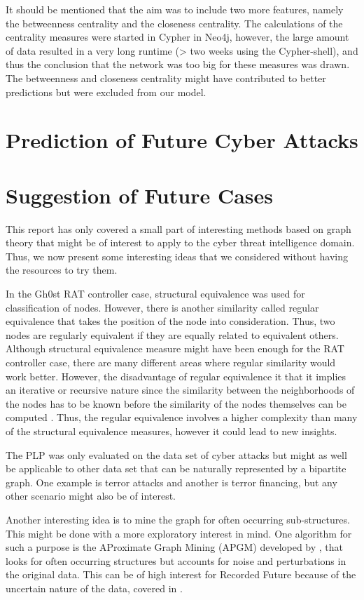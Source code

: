It should be mentioned that the aim was to include two more features, namely the betweenness centrality and the closeness centrality. The calculations of the centrality measures were started in Cypher in Neo4j, however, the large amount of data resulted in a very long runtime (> two weeks using the Cypher-shell), and thus the conclusion that the network was too big for these measures was drawn. The betweenness and closeness centrality might have contributed to better predictions but were excluded from our model.


\section{Prediction of Future Cyber Attacks}


\section{Suggestion of Future Cases}
This report has only covered a small part of interesting methods based on graph theory that might be of interest to apply to the cyber threat intelligence domain. Thus, we now present some interesting ideas that we considered without having the resources to try them. 

In the Gh0st RAT controller case, structural equivalence was used for classification of nodes. However, there is another similarity called regular equivalence that takes the position of the node into consideration. Thus, two nodes are regularly equivalent if they are equally related to equivalent others. Although structural equivalence measure might have been enough for the RAT controller case, there are many different areas where regular similarity would work better. However, the disadvantage of regular equivalence it that it implies an iterative or recursive nature since the similarity between the neighborhoods of the nodes has to be known before the similarity of the nodes themselves can be computed \cite{leicht2006}. Thus, the regular equivalence involves a higher complexity than many of the structural equivalence measures, however it could lead to new insights. 

The PLP was only evaluated on the data set of cyber attacks but might as well be applicable to other data set that can be naturally represented by a bipartite graph. One example is terror attacks and another is terror financing, but any other scenario might also be of interest.

Another interesting idea is to mine the graph for often occurring sub-structures. This might be done with a more exploratory interest in mind. One algorithm for such a purpose is the AProximate Graph Mining (APGM) developed by \citet{Jia2011}, that looks for often occurring structures but accounts for noise and perturbations in the original data. This can be of high interest for Recorded Future because of the uncertain nature of the data, covered in .
